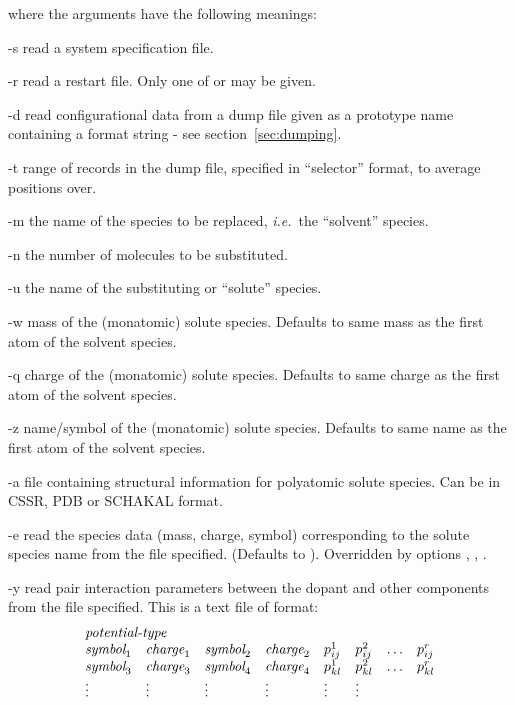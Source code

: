 \documentclass[a4paper,twoside]{report}
\newcommand{\ie}{\emph{i.e.}}
\begin{document}
where the arguments have the following meanings:
\begin{Argdescription}
\item[-s] read a system specification file.
\item[-r] read a restart file. Only one of  or  may be given.
\item[-d] read configurational data from a dump file given as a prototype name
  containing a  format string - see section~\ref{sec:dumping}. 
\item[-t] range of records in the dump file, specified in ``selector''
  format, to average positions over.
\item[-m] the name of the species to be replaced, \ie\ the ``solvent''
  species.
\item[-n] the number of molecules to be substituted.
\item[-u] the name of the substituting or ``solute'' species.
\item[-w] mass of the (monatomic) solute species. Defaults to same mass as the
  first atom of the solvent species.
\item[-q] charge of the (monatomic) solute species. Defaults to same charge as the
  first atom of the solvent species.
\item[-z] name/symbol of the (monatomic) solute species. Defaults to same name as the
  first atom of the solvent species.
\item[-a] file containing structural information for polyatomic solute species. Can be in CSSR, PDB
  or SCHAKAL format.
\item[-e] read the species data (mass, charge, symbol) corresponding to the
solute species name from the file specified.
(Defaults to ). Overridden  by options , , .
\item[-y] read pair interaction parameters between the dopant and other components
from the file specified. This is a text file of format:
\begin{displaymath}
\begin{array}{llllllll}
\multicolumn{4}{l}{\textit{potential-type}} \\
\textit{symbol}_1 & \textit{charge}_1 & \textit{symbol}_2 & \textit{charge}_2
 & p^{1}_{ij} & p^{2}_{ij} & \ldots & p^{r}_{ij}  \\
\textit{symbol}_3 & \textit{charge}_3 & \textit{symbol}_4 & \textit{charge}_4
 & p^{1}_{kl} & p^{2}_{kl} & \ldots & p^{r}_{kl}  \\
\vdots & \vdots & \vdots & \vdots & \vdots & \vdots \\

\end{array}
\end{displaymath}
\end{Argdescription}
\end{document}
